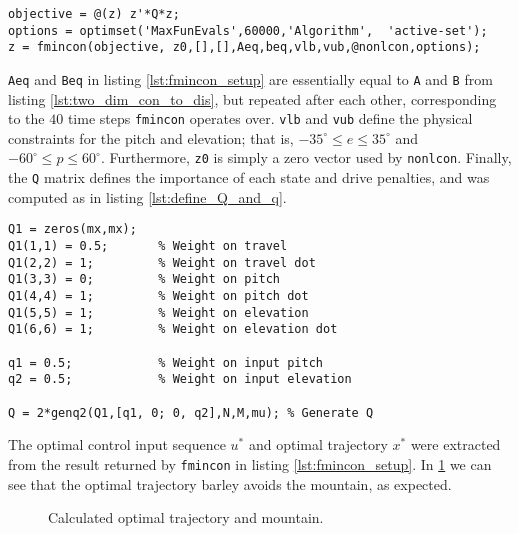 \begin{lstlisting}[caption=Setup of \lstinline!fmincon! for objective function \ref{eq:two_dim_objective_function}.,label=lst:fmincon_setup]
%% Objective function
objective = @(z) z'*Q*z;
options = optimset('MaxFunEvals',60000,'Algorithm',  'active-set');
z = fmincon(objective, z0,[],[],Aeq,beq,vlb,vub,@nonlcon,options);
\end{lstlisting}
\lstinline!Aeq! and \lstinline!Beq! in listing \ref{lst:fmincon_setup} are essentially equal to \lstinline!A! and \lstinline!B! from listing \ref{lst:two_dim_con_to_dis}, but repeated after each other, corresponding to the $40$ time steps \lstinline!fmincon! operates over. \lstinline!vlb! and \lstinline!vub! define the physical constraints for the pitch and elevation; that is, $-35^\circ \leq e \leq 35^\circ$ and $-60^\circ \leq p \leq 60^\circ$. Furthermore, \lstinline!z0! is simply a zero vector used by \lstinline!nonlcon!. Finally, the \lstinline!Q! matrix defines the importance of each state and drive penalties, and was computed as in listing \ref{lst:define_Q_and_q}.
\begin{lstlisting}[caption=Definition of Q matrix and drive penalties.,label=lst:define_Q_and_q]
%% Generate the matrix Q
Q1 = zeros(mx,mx);
Q1(1,1) = 0.5;       % Weight on travel
Q1(2,2) = 1;         % Weight on travel dot
Q1(3,3) = 0;         % Weight on pitch
Q1(4,4) = 1;         % Weight on pitch dot
Q1(5,5) = 1;         % Weight on elevation
Q1(6,6) = 1;         % Weight on elevation dot

q1 = 0.5;            % Weight on input pitch
q2 = 0.5;            % Weight on input elevation

Q = 2*genq2(Q1,[q1, 0; 0, q2],N,M,mu); % Generate Q
\end{lstlisting}
The optimal control input sequence $u^*$ and optimal trajectory $x^*$ were extracted from the result returned by \lstinline!fmincon! in listing \ref{lst:fmincon_setup}. In \cref{fig:mountain} we can see that the optimal trajectory barley avoids the mountain, as expected. 
\begin{figure} 
        \centering
        \setlength{\figureheight}{6cm}
        \setlength{\figurewidth}{10cm}
        
        \caption{Calculated optimal trajectory and mountain.} 
\label{fig:mountain} 
\end{figure}


